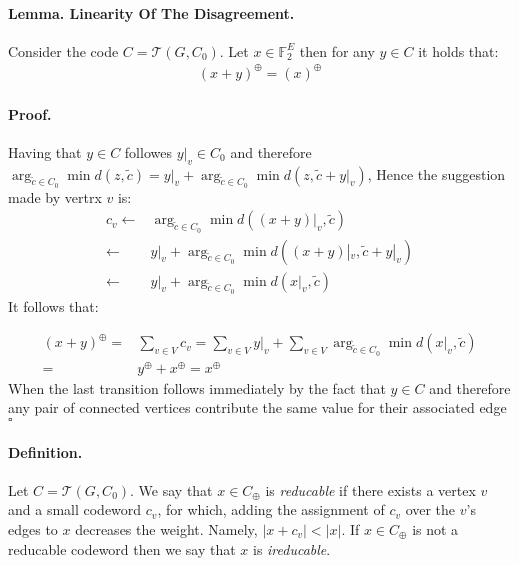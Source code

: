 \documentclass{article}
\newcommand{ \Tann } {  \mathcal{T}\left( G, C_0 \right) }
\begin{document}
\begin{multicols*}{2}
  \paragraph{Lemma. Linearity Of The Disagreement.} Consider the code $C = \Tann$. Let $ x \in \mathbb{F}_{2}^{E}$ then for any $ y \in C$ it holds that: 
  \begin{equation*}
    \begin{split}
      \left( x + y  \right)^{\oplus} = \left( x  \right)^{\oplus} 
    \end{split}
  \end{equation*}
  \paragraph{Proof.} Having that $y \in C$ followes $y|_v \in C_{0}$ and therefore $\arg_{ \tilde{c} \in C_{0}} \min{ d( z  , \tilde{c} ) } = y|_{v} + \arg_{ \tilde{c} \in C_{0}} \min{ d( z, \tilde{c} + y|_{v} ) } $, Hence the suggestion made by vertrx $v$ is: 
  \begin{equation*}
    \begin{split}
      c_{v}\leftarrow &  \arg_{ \tilde{c} \in C_{0}} \min{ d( (x+y)|_{v}  , \tilde{c} ) } \\
      \leftarrow &  y|_{v} +  \arg_{ \tilde{c} \in C_{0}} \min{ d( (x+y)|_{v}  , \tilde{c} + y|_{v} ) } \\
      \leftarrow &  y|_{v} +  \arg_{ \tilde{c} \in C_{0}} \min{ d( x|_{v} , \tilde{c} ) } 
    \end{split}
  \end{equation*}
  It follows that: 

  \begin{equation*}
    \begin{split}
      \left( x + y \right)^{\oplus} =& \sum_{v\in V}{c_{v}} = \sum_{v \in V}{y|_{v}} + \sum_{v\in V}{ \arg_{ \tilde{c} \in C_{0}} \min{ d( x|_{v} , \tilde{c} ) } } \\ 
      =& y^{\oplus} + x^{\oplus} = x^{\oplus}
    \end{split}
  \end{equation*}
  When the last transition follows immediately by the fact that $y \in C$ and therefore any pair of connected vertices contribute the same value for their associated edge $\square$

  \paragraph{Definition.} Let $C = \Tann$. We say that $x \in C_{\oplus}$ is \textit{reducable} if there exists a vertex $v$ and a small codeword $c_v$, for which, adding the assignment of $c_v$ over the $v$'s edges to $x$ decreases the weight. Namely, $|x + c_{v}| < |x|$. If $x \in C_{\oplus}$ is not a reducable codeword then we say that $x$ is \textit{ireducable}.   


\end{multicols*}
\end{document}
